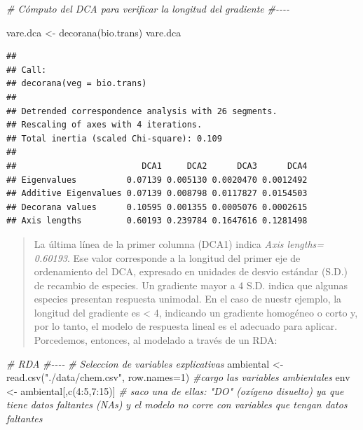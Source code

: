 \documentclass[
]{book}
\newenvironment{Shaded}{\begin{snugshade}}{\end{snugshade}}
\newcommand{\AttributeTok}[1]{\textcolor[rgb]{0.77,0.63,0.00}{#1}}
\newcommand{\CommentTok}[1]{\textcolor[rgb]{0.56,0.35,0.01}{\textit{#1}}}
\newcommand{\DecValTok}[1]{\textcolor[rgb]{0.00,0.00,0.81}{#1}}
\newcommand{\FunctionTok}[1]{\textcolor[rgb]{0.00,0.00,0.00}{#1}}
\newcommand{\NormalTok}[1]{#1}
\newcommand{\OtherTok}[1]{\textcolor[rgb]{0.56,0.35,0.01}{#1}}
\newcommand{\SpecialCharTok}[1]{\textcolor[rgb]{0.00,0.00,0.00}{#1}}
\newcommand{\StringTok}[1]{\textcolor[rgb]{0.31,0.60,0.02}{#1}}
\begin{document}
\begin{Shaded}
\begin{Highlighting}[]
\CommentTok{\# Cómputo del DCA para verificar la longitud del gradiente}
\CommentTok{\#{-}{-}{-}{-}}

\NormalTok{vare.dca }\OtherTok{\textless{}{-}} \FunctionTok{decorana}\NormalTok{(bio.trans)}
\NormalTok{vare.dca}
\end{Highlighting}
\end{Shaded}

\begin{verbatim}
## 
## Call:
## decorana(veg = bio.trans) 
## 
## Detrended correspondence analysis with 26 segments.
## Rescaling of axes with 4 iterations.
## Total inertia (scaled Chi-square): 0.109 
## 
##                         DCA1     DCA2      DCA3      DCA4
## Eigenvalues          0.07139 0.005130 0.0020470 0.0012492
## Additive Eigenvalues 0.07139 0.008798 0.0117827 0.0154503
## Decorana values      0.10595 0.001355 0.0005076 0.0002615
## Axis lengths         0.60193 0.239784 0.1647616 0.1281498
\end{verbatim}

\begin{quote}
La última línea de la primer columna (DCA1) indica \emph{Axis lengths= 0.60193}. Ese valor corresponde a la longitud del primer eje de ordenamiento del DCA, expresado en unidades de desvio estándar (S.D.) de recambio de especies. Un gradiente mayor a 4 S.D. indica que algunas especies presentan respuesta unimodal. En el caso de nuestr ejemplo, la longitud del gradiente es \textless{} 4, indicando un gradiente homogéneo o corto y, por lo tanto, el modelo de respuesta lineal es el adecuado para aplicar.
Porcedemos, entonces, al modelado a través de un RDA:
\end{quote}

\begin{Shaded}
\begin{Highlighting}[]
\CommentTok{\# RDA}
\CommentTok{\#{-}{-}{-}{-}}
\CommentTok{\# Seleccion de variables explicativas}
\NormalTok{ambiental }\OtherTok{\textless{}{-}}\FunctionTok{read.csv}\NormalTok{(}\StringTok{"./data/chem.csv"}\NormalTok{, }\AttributeTok{row.names=}\DecValTok{1}\NormalTok{) }\CommentTok{\#cargo las variables ambientales}
\NormalTok{env }\OtherTok{\textless{}{-}}\NormalTok{ ambiental[,}\FunctionTok{c}\NormalTok{(}\DecValTok{4}\SpecialCharTok{:}\DecValTok{5}\NormalTok{,}\DecValTok{7}\SpecialCharTok{:}\DecValTok{15}\NormalTok{)] }\CommentTok{\# saco una de ellas: "DO" (oxígeno disuelto) ya que tiene datos faltantes (NAs) y el modelo no corre con variables que tengan datos faltantes}
\end{Highlighting}
\end{Shaded}
\end{document}
